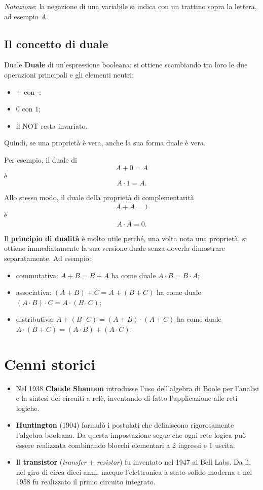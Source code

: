 \textit{Notazione}: la negazione di una variabile si indica con un trattino sopra la lettera, ad esempio $\overline{A}$.

\subsection{Il concetto di duale}

\begin{definizione}{Duale}
\textbf{Duale} di un'espressione booleana: si ottiene scambiando tra loro le due operazioni principali e gli elementi neutri:
\begin{itemize}[leftmargin=1.3em]
    \item $+$ con $\cdot$;
    \item $0$ con $1$;
    \item il NOT resta invariato.
\end{itemize}
Quindi, se una proprietà è vera, anche la sua forma duale è vera.
\end{definizione}

\noindent Per esempio, il duale di
\[
A + 0 = A
\]
\`e
\[
A \cdot 1 = A.
\]

\noindent Allo stesso modo, il duale della proprietà di complementarità
\[
A + \overline{A} = 1
\]
\`e
\[
A \cdot \overline{A} = 0.
\]

\noindent Il \textbf{principio di dualità} è molto utile perché, una volta nota una proprietà, si ottiene immediatamente la sua versione duale senza doverla dimostrare separatamente. Ad esempio:
\begin{itemize}[leftmargin=1.5em]
    \item commutativa: $A+B=B+A$ ha come duale $A\cdot B=B\cdot A$;
    \item associativa: $(A+B)+C=A+(B+C)$ ha come duale $(A\cdot B)\cdot C=A\cdot(B\cdot C)$;
    \item distributiva: $A+(B\cdot C)=(A+B)\cdot(A+C)$ ha come duale $A\cdot(B+C)=(A\cdot B)+(A\cdot C)$.
\end{itemize}

\section{Cenni storici}

\begin{itemize}[leftmargin=1.5em]
    \item Nel 1938 \textbf{Claude Shannon} introdusse l'uso dell'algebra di Boole per l'analisi e la sintesi dei circuiti a relè, inventando di fatto l'applicazione alle reti logiche.
    \item \textbf{Huntington} (1904) formulò i postulati che definiscono rigorosamente l'algebra booleana. Da questa impostazione segue che ogni rete logica può essere realizzata combinando blocchi elementari a 2 ingressi e 1 uscita.
    \item Il \textbf{transistor} (\emph{transfer} + \emph{resistor}) fu inventato nel 1947 ai Bell Labs. Da lì, nel giro di circa dieci anni, nacque l'elettronica a stato solido moderna e nel 1958 fu realizzato il primo circuito integrato.
\end{itemize}

